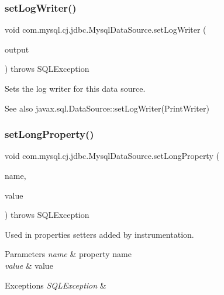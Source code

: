 \subsubsection{\texorpdfstring{set\+Log\+Writer()}{setLogWriter()}}
{\footnotesize\ttfamily void com.\+mysql.\+cj.\+jdbc.\+Mysql\+Data\+Source.\+set\+Log\+Writer (\begin{DoxyParamCaption}\item[{Print\+Writer}]{output }\end{DoxyParamCaption}) throws S\+Q\+L\+Exception}

Sets the log writer for this data source.

\begin{DoxySeeAlso}{See also}
javax.\+sql.\+Data\+Source\+::set\+Log\+Writer(\+Print\+Writer) 
\end{DoxySeeAlso}
\mbox{\label{classcom_1_1mysql_1_1cj_1_1jdbc_1_1_mysql_data_source_a540318fe0f1175849a5773300ec4fa26}} 
\subsubsection{\texorpdfstring{set\+Long\+Property()}{setLongProperty()}}
{\footnotesize\ttfamily void com.\+mysql.\+cj.\+jdbc.\+Mysql\+Data\+Source.\+set\+Long\+Property (\begin{DoxyParamCaption}\item[{String}]{name,  }\item[{long}]{value }\end{DoxyParamCaption}) throws S\+Q\+L\+Exception\hspace{0.3cm}{\ttfamily [protected]}}

Used in properties setters added by instrumentation.


\begin{DoxyParams}{Parameters}
{\em name} & property name \\
\hline
{\em value} & value \\
\hline
\end{DoxyParams}

\begin{DoxyExceptions}{Exceptions}
{\em S\+Q\+L\+Exception} & \\
\hline
\end{DoxyExceptions}
\mbox{\label{classcom_1_1mysql_1_1cj_1_1jdbc_1_1_mysql_data_source_aed210876accef1c6217580a80e5f506b}} 
